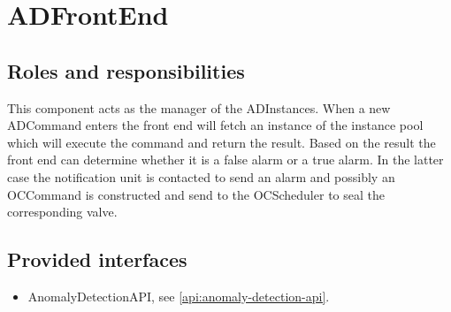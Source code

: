 \section{ADFrontEnd}
\label{element:ad-frontend}

\subsection{Roles and responsibilities}

\npar This component acts as the manager of the ADInstances. When a new
ADCommand enters the front end will fetch an instance of the instance pool which
will execute the command and return the result. Based on the result the front
end can determine whether it is a false alarm or a true alarm. In the latter
case the notification unit is contacted to send an alarm and possibly an
OCCommand is constructed and send to the OCScheduler to seal the
corresponding valve.

\subsection{Provided interfaces}

\begin{itemize}
  \item AnomalyDetectionAPI, see \ref{api:anomaly-detection-api}.
\end{itemize}



